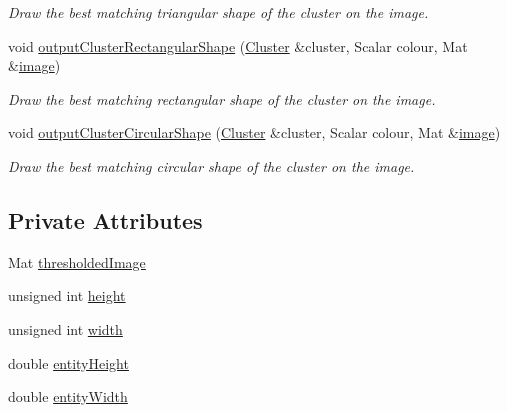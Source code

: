 \begin{DoxyCompactItemize}
\begin{DoxyCompactList}\small\item\em \-Draw the best matching triangular shape of the cluster on the image. \end{DoxyCompactList}\item 
void \hyperlink{classmultiscale_1_1analysis_1_1SimulationClusterDetector_ab7bfa2a55991a5708abfea7fa362214c}{output\-Cluster\-Rectangular\-Shape} (\hyperlink{classmultiscale_1_1analysis_1_1Cluster}{\-Cluster} \&cluster, \-Scalar colour, \-Mat \&\hyperlink{classmultiscale_1_1analysis_1_1Detector_a523830a6cfe409694ce8327c3c736fbd}{image})
\begin{DoxyCompactList}\small\item\em \-Draw the best matching rectangular shape of the cluster on the image. \end{DoxyCompactList}\item 
void \hyperlink{classmultiscale_1_1analysis_1_1SimulationClusterDetector_ab4e0ae4d5850be64ec2399d5c2c36828}{output\-Cluster\-Circular\-Shape} (\hyperlink{classmultiscale_1_1analysis_1_1Cluster}{\-Cluster} \&cluster, \-Scalar colour, \-Mat \&\hyperlink{classmultiscale_1_1analysis_1_1Detector_a523830a6cfe409694ce8327c3c736fbd}{image})
\begin{DoxyCompactList}\small\item\em \-Draw the best matching circular shape of the cluster on the image. \end{DoxyCompactList}\end{DoxyCompactItemize}
\subsection*{\-Private \-Attributes}
\begin{DoxyCompactItemize}
\item 
\-Mat \hyperlink{classmultiscale_1_1analysis_1_1SimulationClusterDetector_aca2aae9914ef643a543a834e61b1cccf}{thresholded\-Image}
\item 
unsigned int \hyperlink{classmultiscale_1_1analysis_1_1SimulationClusterDetector_a9d0a0fe5d9ea0f2516d07bf44b1da257}{height}
\item 
unsigned int \hyperlink{classmultiscale_1_1analysis_1_1SimulationClusterDetector_a4c66a82aa1749dce31c767bc4008d904}{width}
\item 
double \hyperlink{classmultiscale_1_1analysis_1_1SimulationClusterDetector_a2ba5c2738d32f71ccaacba4129b7bcfc}{entity\-Height}
\item 
double \hyperlink{classmultiscale_1_1analysis_1_1SimulationClusterDetector_a9212da88b787b8f9791f27d913b6d05d}{entity\-Width}
\end{DoxyCompactItemize}
